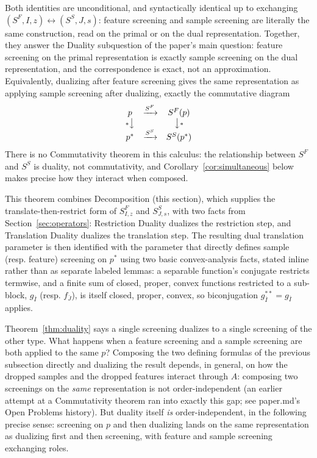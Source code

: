 Both identities are unconditional, and syntactically identical up to
exchanging \((S^F,I,z)\leftrightarrow(S^S,J,s)\): feature screening and
sample screening are literally the same construction, read on the
primal or on the dual representation. Together, they answer the
Duality subquestion of the paper's main question: feature screening on
the primal representation is exactly sample screening on the dual
representation, and the correspondence is exact, not an approximation.
Equivalently, dualizing after feature screening gives the same
representation as applying sample screening after dualizing, exactly
the commutative diagram
\[
\begin{array}{ccc}
p & \xrightarrow{S^F} & S^F(p)\\
{\scriptstyle *}\big\downarrow & & \big\downarrow{\scriptstyle *}\\
p^* & \xrightarrow{S^S} & S^S(p^*)
\end{array}
\]
There is no Commutativity theorem in this calculus: the relationship
between \(S^F\) and \(S^S\) is duality, not commutativity, and
Corollary~\ref{cor:simultaneous} below makes precise how they interact
when composed.

This theorem combines Decomposition (this section), which supplies the
translate-then-restrict form of \(S^F_{I,z}\) and \(S^S_{J,s}\), with
two facts from Section~\ref{sec:operators}: Restriction Duality
dualizes the restriction step, and Translation Duality dualizes the
translation step. The resulting dual translation parameter is then
identified with the parameter that directly defines sample (resp.
feature) screening on \(p^*\) using two basic convex-analysis facts,
stated inline rather than as separate labeled lemmas: a separable
function's conjugate restricts termwise, and a finite sum of closed,
proper, convex functions restricted to a sub-block, \(g_{\bar I}\)
(resp. \(f_{\bar J}\)), is itself closed, proper, convex, so
biconjugation \(g_{\bar I}^{**}=g_{\bar I}\) applies.

Theorem~\ref{thm:duality} says a single screening dualizes to a single
screening of the other type. What happens when a feature screening and
a sample screening are both applied to the same \(p\)? Composing the
two defining formulas of the previous subsection directly and
dualizing the result depends, in general, on how the dropped samples
and the dropped features interact through \(A\): composing two
screenings on the \emph{same} representation is not order-independent
(an earlier attempt at a Commutativity theorem ran into exactly this
gap; see paper.md's Open Problems history). But duality itself
\emph{is} order-independent, in the following precise sense: screening
on \(p\) and then dualizing lands on the same representation as
dualizing first and then screening, with feature and sample screening
exchanging roles.

